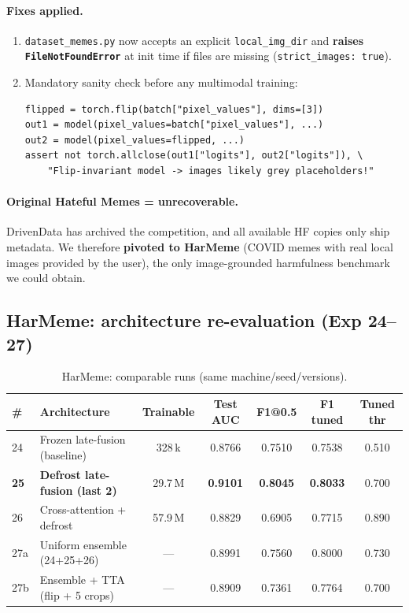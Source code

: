 \documentclass[11pt,a4paper]{article}
\begin{document}
\paragraph{Fixes applied.}
\begin{enumerate}[leftmargin=*]
    \item \texttt{dataset\_memes.py} now accepts an explicit \texttt{local\_img\_dir}
    and \textbf{raises \texttt{FileNotFoundError}} at init time if files are
    missing (\texttt{strict\_images: true}).
    \item Mandatory sanity check before any multimodal training:
\begin{lstlisting}[language={}]
flipped = torch.flip(batch["pixel_values"], dims=[3])
out1 = model(pixel_values=batch["pixel_values"], ...)
out2 = model(pixel_values=flipped, ...)
assert not torch.allclose(out1["logits"], out2["logits"]), \
    "Flip-invariant model -> images likely grey placeholders!"
\end{lstlisting}
\end{enumerate}

\paragraph{Original Hateful Memes = unrecoverable.} DrivenData has archived the
competition, and all available HF copies only ship metadata. We therefore
\textbf{pivoted to HarMeme} (COVID memes with real local images provided by the
user), the only image-grounded harmfulness benchmark we could obtain.

\subsection{HarMeme: architecture re-evaluation (Exp 24--27)}
\label{sec:harmeme}

\begin{table}[h]
\centering\small
\caption{HarMeme: comparable runs (same machine/seed/versions).}
\label{tab:harmeme}
\begin{tabular}{l l c c c c c}
\toprule
\# & Architecture & Trainable & Test AUC & F1@0.5 & F1 tuned & Tuned thr \\
\midrule
24 & Frozen late-fusion (baseline)            & 328\,k    & 0.8766 & 0.7510 & 0.7538 & 0.510 \\
\textbf{25} & \textbf{Defrost late-fusion (last 2)} & 29.7\,M  & \textbf{0.9101} & \textbf{0.8045} & \textbf{0.8033} & 0.700 \\
26 & Cross-attention + defrost                & 57.9\,M   & 0.8829 & 0.6905 & 0.7715 & 0.890 \\
27a & Uniform ensemble (24+25+26)             & ---       & 0.8991 & 0.7560 & 0.8000 & 0.730 \\
27b & Ensemble + TTA (flip + 5 crops)         & ---       & 0.8909 & 0.7361 & 0.7764 & 0.700 \\
\bottomrule
\end{tabular}
\end{table}
\end{document}
